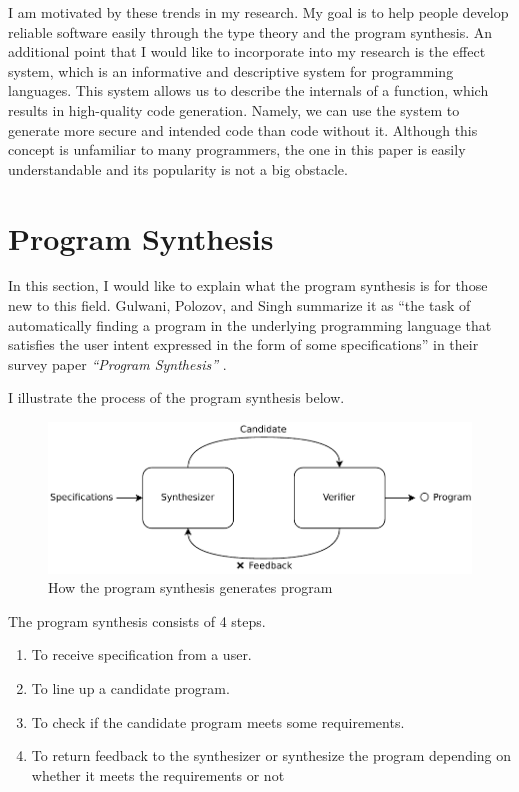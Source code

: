 \documentclass[12pt, a4paper, titlepage]{report}
\begin{document}
    I am motivated by these trends in my research.
    My goal is to help people develop reliable software easily through the type theory and the program synthesis.
    An additional point that I would like to incorporate into my research is the effect system, which is an informative and descriptive system for programming languages.
    This system allows us to describe the internals of a function, which results in high-quality code generation.
    Namely, we can use the system to generate more secure and intended code than code without it.
    Although this concept is unfamiliar to many programmers, the one in this paper is easily understandable and its popularity is not a big obstacle.

  \section{Program Synthesis}
    In this section, I would like to explain what the program synthesis is for those new to this field.
    Gulwani, Polozov, and Singh summarize it as ``the task of automatically finding a program in the underlying programming language that satisfies the user intent expressed in the form of some specifications'' in their survey paper \emph{``Program Synthesis''} \cite{gulwani:2017}.

    I illustrate the process of the program synthesis below.
    \begin{figure}[htbp]
      \centering
      \includegraphics[width=1\textwidth]{images/synthesis.pdf}
      \caption{How the program synthesis generates program}
      \label{synthesisOverview}
    \end{figure}

    The program synthesis consists of 4 steps.
    \begin{enumerate}
      \item To receive specification from a user.
      \item To line up a candidate program.
      \item To check if the candidate program meets some requirements.
      \item To return feedback to the synthesizer or synthesize the program depending on whether it meets the requirements or not
    \end{enumerate}
\end{document}
